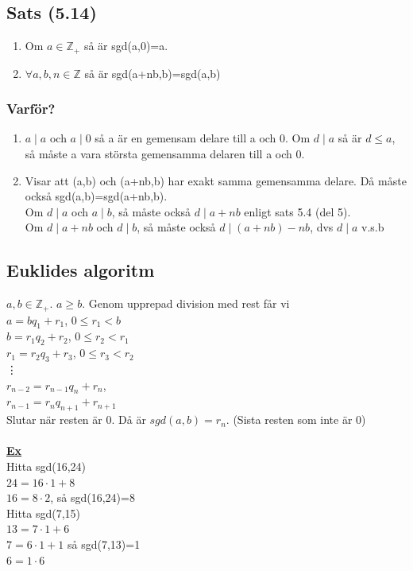 \documentclass{article}
\begin{document}
    \subsection{Sats (5.14)}
    \begin{enumerate}
        \item Om $a\in\mathbb{Z_{+}}$ så är sgd(a,0)=a.
        \item $\forall a,b,n\in \mathbb{Z}$ så är sgd(a+nb,b)=sgd(a,b)
    \end{enumerate}
    \subsubsection{Varför?}
    \begin{enumerate}
        \item $a\mid a$ och $a\mid 0$ så a är en gemensam delare till a och 0. Om $d\mid a$ så är $d\leq a$, så måste a vara största gemensamma delaren till a och 0.
        \item Visar att (a,b) och (a+nb,b) har exakt samma gemensamma delare. Då måste också sgd(a,b)=sgd(a+nb,b).\\
                Om $d\mid a$ och $a\mid b$, så måste också $d\mid a+nb$ enligt sats 5.4 (del 5).\\
                Om $d\mid a+nb$ och $d\mid b$, så måste också $d\mid (a+nb)-nb$, dvs $d\mid a$ v.s.b
    \end{enumerate}
    \subsection{Euklides algoritm}
    $a,b\in \mathbb{Z_{+}}$. $a\geq b$. Genom upprepad division med rest får vi\\
    \indent $a=bq_{1}+r_{1}$, $0\leq r_{1}<b$\\
    \indent $b=r_{1}q_{2}+r_{2}$, $0\leq r_{2}<r_{1}$\\
    \indent $r_{1}=r_{2}q_{3}+r_{3}$, $0\leq r_{3}<r_{2}$\\
    \indent \vdots\\
    \indent $r_{n-2}=r_{n-1}q_{n}+r_{n}$,\\
    \indent $r_{n-1}=r_{n}q_{n+1}+r_{n+1}$\\
    Slutar när resten är 0. Då är $sgd(a,b)=r_{n}$. (Sista resten som inte är 0)\\\\
    \underline{\textbf{Ex}}\\
    Hitta sgd(16,24)\\
    \indent $24=16\cdot 1 + 8$\\
    \indent $16=8\cdot 2$, så sgd(16,24)=8\\
    Hitta sgd(7,15)\\
    \indent $13=7\cdot 1+6$\\
    \indent $7=6\cdot 1+1$ så sgd(7,13)=1\\
    \indent $6=1\cdot 6$\\
\end{document}
